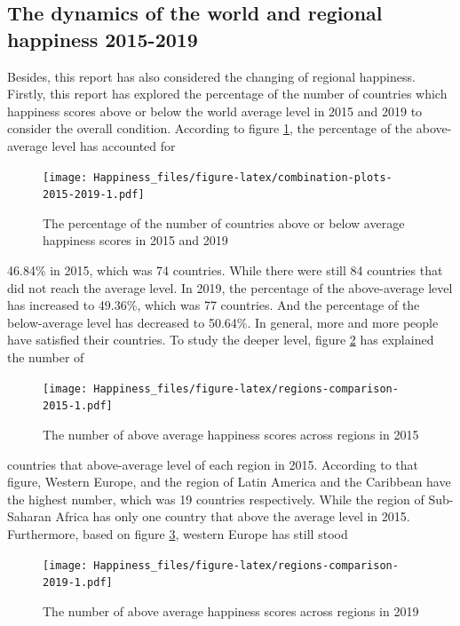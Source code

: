 \documentclass[11pt,a4paper,]{article}
\begin{document}
\hypertarget{the-dynamics-of-the-world-and-regional-happiness-2015-2019}{%
\subsection{The dynamics of the world and regional happiness 2015-2019}\label{the-dynamics-of-the-world-and-regional-happiness-2015-2019}}

Besides, this report has also considered the changing of regional happiness. Firstly, this report has explored the percentage of the number of countries which happiness scores above or below the world average level in 2015 and 2019 to consider the overall condition. According to figure \ref{fig:combination-plots-2015-2019}, the percentage of the above-average level has accounted for

\begin{figure}
\centering
\texttt{[image: Happiness\_files/figure-latex/combination-plots-2015-2019-1.pdf]}
\caption{\label{fig:combination-plots-2015-2019}The percentage of the number of countries above or below average happiness scores in 2015 and 2019}
\end{figure}

46.84\% in 2015, which was 74 countries. While there were still 84 countries that did not reach the average level. In 2019, the percentage of the above-average level has increased to 49.36\%, which was 77 countries. And the percentage of the below-average level has decreased to 50.64\%. In general, more and more people have satisfied their countries.
To study the deeper level, figure \ref{fig:regions-comparison-2015} has explained the number of

\begin{figure}
\centering
\texttt{[image: Happiness\_files/figure-latex/regions-comparison-2015-1.pdf]}
\caption{\label{fig:regions-comparison-2015}The number of above average happiness scores across regions in 2015}
\end{figure}

countries that above-average level of each region in 2015. According to that figure, Western Europe, and the region of Latin America and the Caribbean have the highest number, which was 19 countries respectively. While the region of Sub-Saharan Africa has only one country that above the average level in 2015. Furthermore, based on figure \ref{fig:regions-comparison-2019}, western Europe has still stood

\begin{figure}
\centering
\texttt{[image: Happiness\_files/figure-latex/regions-comparison-2019-1.pdf]}
\caption{\label{fig:regions-comparison-2019}The number of above average happiness scores across regions in 2019}
\end{figure}
\end{document}

